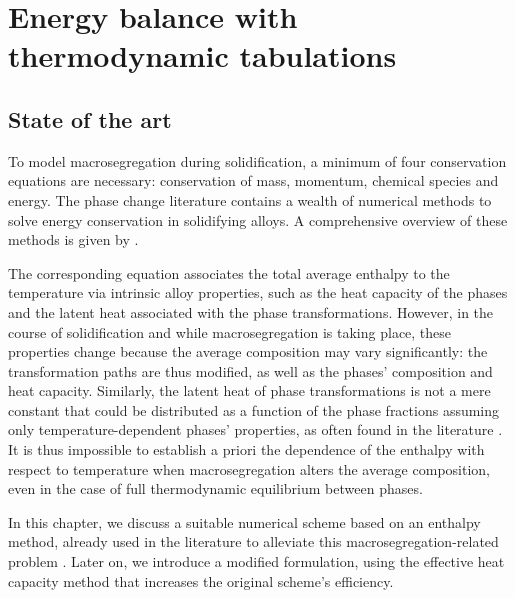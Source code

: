 \chapter{Energy balance with thermodynamic tabulations}
\begin{nolinkcolors} 
\minitoc
\end{nolinkcolors}
\newpage


\section{State of the art}

To model macrosegregation during solidification, a minimum of four conservation equations are necessary:
conservation  of  mass, momentum,  chemical  species and  energy. The  phase  change
literature  contains a  wealth of numerical methods to solve energy conservation
in solidifying alloys. A comprehensive overview of these methods is given by \citet{swaminathan_enthalpy_1993}.

The corresponding equation associates the total average enthalpy to the
temperature  via  intrinsic  alloy  properties, such  as the heat  capacity of  the
phases and the latent  heat associated with the phase transformations. However, in the course
of solidification and while macrosegregation is taking place, these  properties change because the average
composition may  vary  significantly: the  transformation paths are thus modified, as well as
the phases' composition and heat capacity. Similarly, the latent heat of phase  transformations
is not a mere constant that could be distributed as a function of the phase fractions
assuming only temperature-dependent phases' properties, as often found in the literature \citep{bellet_call_2009}.
It is thus impossible to establish a priori the dependence of the enthalpy with respect
to temperature when macrosegregation alters the average composition, even in the case of full thermodynamic equilibrium
between phases. 

In this chapter, we discuss a suitable numerical scheme based on an enthalpy method,
already used in the literature  to  alleviate this macrosegregation-related problem \citep{swaminathan_enthalpy_1993,
carozzani_direct_2013}. Later on, we introduce a modified formulation, using the effective heat capacity method that 
increases the original scheme's efficiency. 

